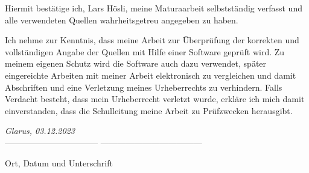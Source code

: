 \documentclass[12pt, a4paper, titlepage]{report}
\begin{document}


\pagebreak

Hiermit bestätige ich, Lars Hösli, meine Maturaarbeit selbstständig verfasst
und alle verwendeten Quellen wahrheitsgetreu angegeben zu haben.

Ich nehme zur Kenntnis, dass meine Arbeit zur Überprüfung der korrekten und
vollständigen Angabe der Quellen mit Hilfe einer Software geprüft wird. Zu meinem
eigenen Schutz wird die Software auch dazu verwendet, später eingereichte Arbeiten mit meiner Arbeit elektronisch zu vergleichen und damit Abschriften und
eine Verletzung meines Urheberrechts zu verhindern. Falls Verdacht besteht, dass
mein Urheberrecht verletzt wurde, erkläre ich mich damit einverstanden, dass die
Schulleitung meine Arbeit zu Prüfzwecken herausgibt.

\vspace{2.0cm}
\emph{Glarus, 03.12.2023}\\
--------------------------------- ------------------------------------

Ort, Datum und Unterschrift

\end{document}
